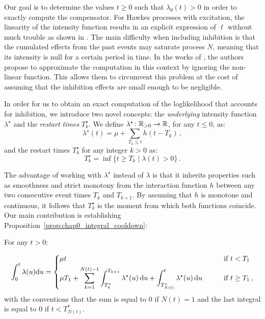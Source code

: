     Our goal is to determine the values $t\geq 0$ such that $\lambda_\theta(t) > 0$ in order to exactly compute the compensator.
    For Hawkes processes with excitation, the linearity of the intensity function results in an explicit expression of $\ell$ without much trouble as shown in \textcite{Ozaki1979}.
    The main difficulty when including inhibition is that the cumulated effects from the past events may saturate process $N$, meaning that its intensity is null for a certain period in time.
    In the works of \textcite{Lemonnier2014}, the authors propose to approximate the computation in this context by ignoring the non-linear function.
    This allows them to circumvent this problem at the cost of assuming that the inhibition effects are small enough to be negligible.

    In order for us to obtain an exact computation of the loglikelihood that accounts for inhibition, we introduce two novel concepts: the \emph{underlying} intensity function $\lambda^\star$ and the \emph{restart times} $T_k^\star$.
    We define $\lambda^\star\colon {\mathbb R}_{>0}\to {\mathbb R}$, for any $t\leq 0$, as:
    \[\lambda^\star(t) = \mu + \sum_{T_k \leq t}{h(t-T_k)}\,,\]
    and the restart times $T_k^\star$ for any integer $k>0$ as:
    \[T_k^\star = \inf\{t\geq T_k \mid \lambda(t) > 0\}\,.\]

    The advantage of working with $\lambda^\star$ instead of $\lambda$ is that it inherits properties such as smoothness and strict monotony from the interaction function $h$ between any two consecutive event times $T_k$ and $T_{k+1}$.
    By assuming that $h$ is monotone and continuous, it follows that $T_k^\star$ is the moment from which both functions coincide.
    Our main contribution is establishing Proposition~\ref{prop:chap0_integral_cooldown}:

    \begin{proposition}\label{prop:chap0_integral_cooldown}
      For any $t>0$:
      
      \begin{equation}\label{eq:chap0_compensator_general}
      \int_{0}^{t}{\lambda(u){\mathrm{d}} u} =
      \begin{dcases}
          \mu t &\text{\qquad if $t<T_1$}\\
          \mu T_1 + \sum_{k=1}^{{N(t)-1}}{\int_{T_{k}^\star}^{T_{k+1}}{\lambda^\star(u)\,\mathrm{d}u}} + \int_{T_{N(t)}^\star}^{t}{\lambda^\star(u)\,\mathrm{d}u} &\text{\qquad if $t\geq T_1$}\,,
      \end{dcases}
      \end{equation}
      with the conventions that the sum is equal to $0$ if ${N(t)} = 1$ and the last integral is equal to $0$ if $t < T_{N(t)}^*$.
      \end{proposition}
    
